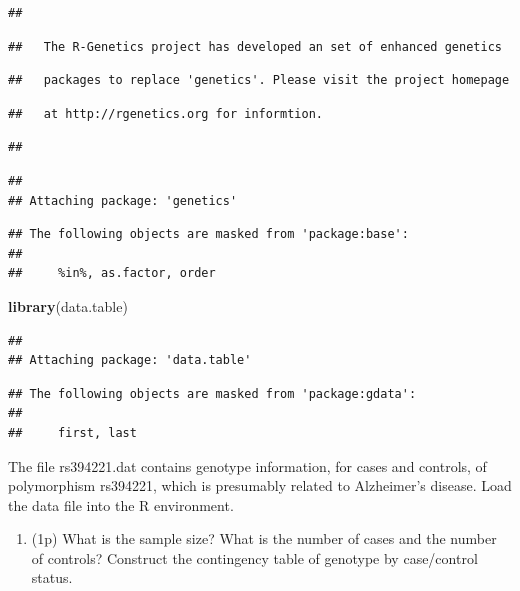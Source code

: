 \documentclass[
]{article}
\newenvironment{Shaded}{\begin{snugshade}}{\end{snugshade}}
\newcommand{\KeywordTok}[1]{\textcolor[rgb]{0.13,0.29,0.53}{\textbf{#1}}}
\newcommand{\NormalTok}[1]{#1}
\providecommand{\tightlist}{%
  \setlength{\itemsep}{0pt}\setlength{\parskip}{0pt}}
\begin{document}
\begin{verbatim}
## 
\end{verbatim}

\begin{verbatim}
##   The R-Genetics project has developed an set of enhanced genetics
\end{verbatim}

\begin{verbatim}
##   packages to replace 'genetics'. Please visit the project homepage
\end{verbatim}

\begin{verbatim}
##   at http://rgenetics.org for informtion.
\end{verbatim}

\begin{verbatim}
## 
\end{verbatim}

\begin{verbatim}
## 
## Attaching package: 'genetics'
\end{verbatim}

\begin{verbatim}
## The following objects are masked from 'package:base':
## 
##     %in%, as.factor, order
\end{verbatim}

\begin{Shaded}
\begin{Highlighting}[]
\KeywordTok{library}\NormalTok{(data.table)}
\end{Highlighting}
\end{Shaded}

\begin{verbatim}
## 
## Attaching package: 'data.table'
\end{verbatim}

\begin{verbatim}
## The following objects are masked from 'package:gdata':
## 
##     first, last
\end{verbatim}

The file rs394221.dat contains genotype information, for cases and
controls, of polymorphism rs394221, which is presumably related to
Alzheimer's disease. Load the data file into the R environment.

\begin{enumerate}
\def\labelenumi{\arabic{enumi}.}
\tightlist
\item
  (1p) What is the sample size? What is the number of cases and the
  number of controls? Construct the contingency table of genotype by
  case/control status.
\end{enumerate}
\end{document}
